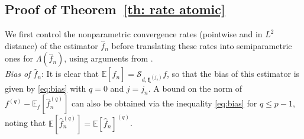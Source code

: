 \documentclass[preprint]{imsart}
\numberwithin{equation}{section}
\begin{document}
\begin{appendix}
\subsection{Proof of Theorem~\ref{th: rate atomic}}

We first control the nonparametric convergence rates (pointwise and in $L^2$ distance) of the estimator $\hat{f}_n$ before translating these rates into semiparametric ones for $\Lambda(\hat{f}_n)$, using arguments from \cite{GoldsteinMesser92}.\\


\textit{Bias of $\hat{f}_n$}: It is clear that $\mathbb{E}[\hat{f}_n]=\mathcal{S}_{d,\mathbf{\xi}^{(j_n)}}f$, so that the bias of this estimator is given by \eqref{eq:bias} with $q=0$ and $j=j_n$. A bound on the norm of $f^{(q)} - \mathbb{E}_f\left[\hat{f}_n^{(q)}\right]$ can also be obtained  via the inequality \eqref{eq:bias} for $q \leq p-1$, noting that $\mathbb{E}\left[\hat{f}_n^{(q)}\right]= \mathbb{E}\left[\hat{f}_n\right]^{(q)}$.


\end{appendix}
\end{document}
